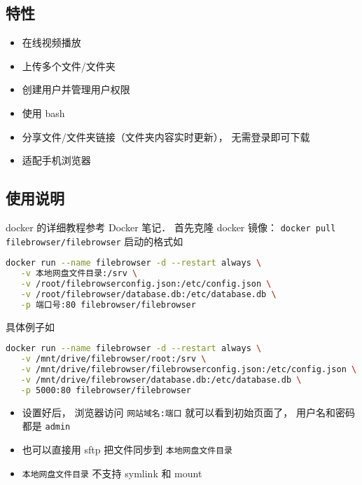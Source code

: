 
\begin{issues}
\issueDraft
\end{issues}

\subsection{特性}
\begin{itemize}
\item 在线视频播放
\item 上传多个文件/文件夹
\item 创建用户并管理用户权限
\item 使用 bash
\item 分享文件/文件夹链接（文件夹内容实时更新）， 无需登录即可下载
\item 适配手机浏览器
\end{itemize}

\subsection{使用说明}
docker 的详细教程参考 Docker 笔记． 首先克隆 docker 镜像： \verb|docker pull filebrowser/filebrowser|
启动的格式如
\begin{lstlisting}[language=bash]
docker run --name filebrowser -d --restart always \
   -v 本地网盘文件目录:/srv \
   -v /root/filebrowserconfig.json:/etc/config.json \
   -v /root/filebrowser/database.db:/etc/database.db \
   -p 端口号:80 filebrowser/filebrowser
\end{lstlisting}
具体例子如
\begin{lstlisting}[language=bash]
docker run --name filebrowser -d --restart always \
   -v /mnt/drive/filebrowser/root:/srv \
   -v /mnt/drive/filebrowser/filebrowserconfig.json:/etc/config.json \
   -v /mnt/drive/filebrowser/database.db:/etc/database.db \
   -p 5000:80 filebrowser/filebrowser
\end{lstlisting}

\begin{itemize}
\item 设置好后， 浏览器访问 \verb`网站域名:端口` 就可以看到初始页面了， 用户名和密码都是 \verb`admin`
\item 也可以直接用 sftp 把文件同步到 \verb`本地网盘文件目录`
\item \verb`本地网盘文件目录` 不支持 symlink 和 mount
\end{itemize}
